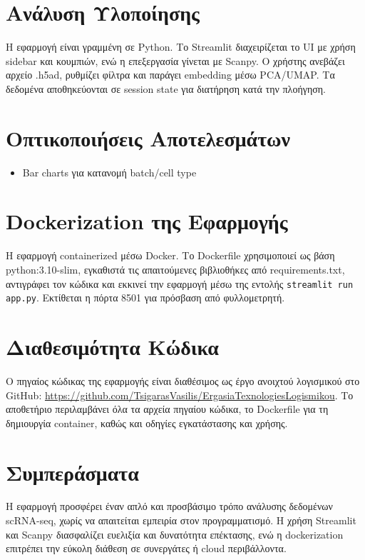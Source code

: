 \documentclass[a4paper,10pt]{article}
\begin{document}
\section{Ανάλυση Υλοποίησης}
Η εφαρμογή είναι γραμμένη σε Python. Το Streamlit διαχειρίζεται το UI με χρήση sidebar και κουμπιών, ενώ η επεξεργασία γίνεται με Scanpy. Ο χρήστης ανεβάζει αρχείο .h5ad, ρυθμίζει φίλτρα και παράγει embedding μέσω PCA/UMAP. Τα δεδομένα αποθηκεύονται σε session state για διατήρηση κατά την πλοήγηση.

\section{Οπτικοποιήσεις Αποτελεσμάτων}

\begin{itemize}
  \item Bar charts για κατανομή batch/cell type
\end{itemize}

\section{Dockerization της Εφαρμογής}

Η εφαρμογή containerized μέσω Docker. Το Dockerfile χρησιμοποιεί ως βάση python:3.10-slim, εγκαθιστά τις απαιτούμενες βιβλιοθήκες από requirements.txt, αντιγράφει τον κώδικα και εκκινεί την εφαρμογή μέσω της εντολής \texttt{streamlit run app.py}. Εκτίθεται η πόρτα 8501 για πρόσβαση από φυλλομετρητή.

\section{Διαθεσιμότητα Κώδικα}
Ο πηγαίος κώδικας της εφαρμογής είναι διαθέσιμος ως έργο ανοιχτού λογισμικού στο GitHub: \url{https://github.com/TsigarasVasilis/ErgasiaTexnologiesLogismikou}. Το αποθετήριο περιλαμβάνει όλα τα αρχεία πηγαίου κώδικα, το Dockerfile για τη δημιουργία container, καθώς και οδηγίες εγκατάστασης και χρήσης.

\section{Συμπεράσματα}
Η εφαρμογή προσφέρει έναν απλό και προσβάσιμο τρόπο ανάλυσης δεδομένων scRNA-seq, χωρίς να απαιτείται εμπειρία στον προγραμματισμό. Η χρήση Streamlit και Scanpy διασφαλίζει ευελιξία και δυνατότητα επέκτασης, ενώ η dockerization επιτρέπει την εύκολη διάθεση σε συνεργάτες ή cloud περιβάλλοντα.
\end{document}
